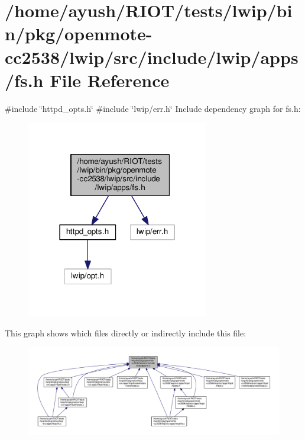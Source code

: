 \hypertarget{openmote-cc2538_2lwip_2src_2include_2lwip_2apps_2fs_8h}{}\section{/home/ayush/\+R\+I\+O\+T/tests/lwip/bin/pkg/openmote-\/cc2538/lwip/src/include/lwip/apps/fs.h File Reference}
\label{openmote-cc2538_2lwip_2src_2include_2lwip_2apps_2fs_8h}
{\ttfamily \#include \char`\"{}httpd\+\_\+opts.\+h\char`\"{}}\newline
{\ttfamily \#include \char`\"{}lwip/err.\+h\char`\"{}}\newline
Include dependency graph for fs.\+h\+:
\nopagebreak
\begin{figure}[H]
\begin{center}
\leavevmode
\includegraphics[width=226pt]{openmote-cc2538_2lwip_2src_2include_2lwip_2apps_2fs_8h__incl}
\end{center}
\end{figure}
This graph shows which files directly or indirectly include this file\+:
\nopagebreak
\begin{figure}[H]
\begin{center}
\leavevmode
\includegraphics[width=350pt]{openmote-cc2538_2lwip_2src_2include_2lwip_2apps_2fs_8h__dep__incl}
\end{center}
\end{figure}
